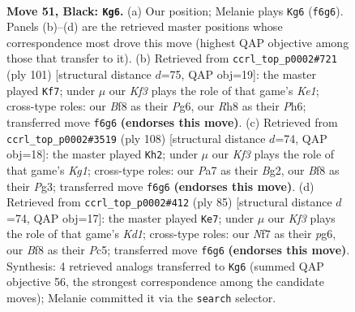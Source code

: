\documentclass[11pt]{article}
\begin{document}
\clearpage

\begin{figure}[p]\centering
\begin{subfigure}{0.46\textwidth}\centering
\resizebox{\linewidth}{!}{%
\newchessgame
\chessboard[
  setfen={5b1r/p4n1p/P4k2/3r4/5B2/1Pp4P/R1P3PK/2RB4 b - - 10 51},
  showmover=false,
  pgfstyle=straightmove, color=movearrow, markmove={f6-g6}
]}
\caption{}
\end{subfigure}\hfill
\begin{subfigure}{0.46\textwidth}\centering
\resizebox{\linewidth}{!}{%
\newchessgame
\chessboard[
  setfen={4k3/8/3B2pp/6p1/p7/P4P1P/3R2PK/2r2b2 b - - 27 51},
  showmover=false,
  pgfstyle=straightmove, color=movearrow, markmove={e8-f7}
]}
\caption{}
\end{subfigure}
\\[4pt]
\begin{subfigure}{0.46\textwidth}\centering
\resizebox{\linewidth}{!}{%
\newchessgame
\chessboard[
  setfen={2r1b3/r4pkp/3P2p1/4R3/3R4/6P1/5PB1/6K1 w - - 5 55},
  showmover=false,
  pgfstyle=straightmove, color=movearrow, markmove={g1-h2}
]}
\caption{}
\end{subfigure}\hfill
\begin{subfigure}{0.46\textwidth}\centering
\resizebox{\linewidth}{!}{%
\newchessgame
\chessboard[
  setfen={3kb3/8/4p1P1/2p1P3/1pP1BK2/p4P2/P5R1/4r3 b - - 0 43},
  showmover=false,
  pgfstyle=straightmove, color=movearrow, markmove={d8-e7}
]}
\caption{}
\end{subfigure}
\caption{\textbf{Move 51, Black: \texttt{Kg6}.} (a) Our position; Melanie plays \texttt{Kg6} (\texttt{f6g6}). Panels (b)--(d) are the retrieved master positions whose correspondence most drove this move (highest QAP objective among those that transfer to it). (b) Retrieved from \texttt{ccrl\_top\_p0002\#721} (ply 101) [structural distance $d$=75, QAP obj=19]: the master played \texttt{Kf7}; under $\mu$ our \emph{Kf3} plays the role of that game's \emph{Ke1}; cross-type roles: our \emph{B}f8 as their \emph{P}g6, our \emph{R}h8 as their \emph{P}h6; transferred move \texttt{f6g6} \textbf{(endorses this move)}. (c) Retrieved from \texttt{ccrl\_top\_p0002\#3519} (ply 108) [structural distance $d$=74, QAP obj=18]: the master played \texttt{Kh2}; under $\mu$ our \emph{Kf3} plays the role of that game's \emph{Kg1}; cross-type roles: our \emph{P}a7 as their \emph{B}g2, our \emph{B}f8 as their \emph{P}g3; transferred move \texttt{f6g6} \textbf{(endorses this move)}. (d) Retrieved from \texttt{ccrl\_top\_p0002\#412} (ply 85) [structural distance $d$=74, QAP obj=17]: the master played \texttt{Ke7}; under $\mu$ our \emph{Kf3} plays the role of that game's \emph{Kd1}; cross-type roles: our \emph{N}f7 as their \emph{p}g6, our \emph{B}f8 as their \emph{P}c5; transferred move \texttt{f6g6} \textbf{(endorses this move)}. Synthesis: 4 retrieved analogs transferred to \texttt{Kg6} (summed QAP objective 56, the strongest correspondence among the candidate moves); Melanie committed it via the \texttt{search} selector.}
\label{fig:thought-m101}
\end{figure}
\end{document}
